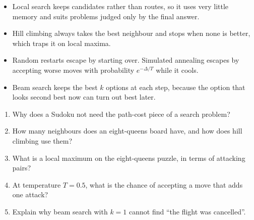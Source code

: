 \begin{chapterrecap}
\begin{itemize}
  \item Local search keeps candidates rather than routes, so it uses very little memory and suits problems judged only by the final answer.
  \item Hill climbing always takes the best neighbour and stops when none is better, which traps it on local maxima.
  \item Random restarts escape by starting over. Simulated annealing escapes by accepting worse moves with probability $e^{-\Delta/T}$ while it cools.
  \item Beam search keeps the best $k$ options at each step, because the option that looks second best now can turn out best later.
\end{itemize}
\end{chapterrecap}

\begin{quickcheck}
\begin{enumerate}
  \item Why does a Sudoku not need the path-cost piece of a search problem?
  \item How many neighbours does an eight-queens board have, and how does hill climbing use them?
  \item What is a local maximum on the eight-queens puzzle, in terms of attacking pairs?
  \item At temperature $T=0.5$, what is the chance of accepting a move that adds one attack?
  \item Explain why beam search with $k=1$ cannot find ``the flight was cancelled''.
\end{enumerate}
\end{quickcheck}
